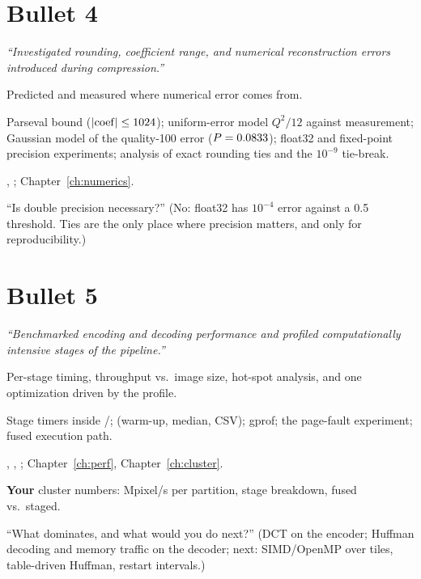 \section{Bullet 4}
\textit{``Investigated rounding, coefficient range, and numerical reconstruction errors introduced during compression.''}

\begin{description}[leftmargin=2.2cm,style=nextline]
\item[What] Predicted and measured where numerical error comes from.
\item[How] Parseval bound ($|{\rm coef}|\le1024$); uniform-error model $Q^2/12$ against measurement; Gaussian model of the quality-100 error ($P=0.0833$); float32 and fixed-point precision experiments; analysis of exact rounding ties and the $10^{-9}$ tie-break.
\item[Where] , ; Chapter~\ref{ch:numerics}.
\item[Expect] ``Is double precision necessary?'' (No: float32 has $10^{-4}$ error against a 0.5 threshold. Ties are the only place where precision matters, and only for reproducibility.)
\end{description}

\section{Bullet 5}
\textit{``Benchmarked encoding and decoding performance and profiled computationally intensive stages of the pipeline.''}

\begin{description}[leftmargin=2.2cm,style=nextline]
\item[What] Per-stage timing, throughput vs.\ image size, hot-spot analysis, and one optimization driven by the profile.
\item[How] Stage timers inside /;  (warm-up, median, CSV); gprof; the page-fault experiment; fused execution path.
\item[Where] , , ; Chapter~\ref{ch:perf}, Chapter~\ref{ch:cluster}.
\item[Evidence to prepare] \textbf{Your} cluster numbers: Mpixel/s per partition, stage breakdown, fused vs.\ staged.
\item[Expect] ``What dominates, and what would you do next?'' (DCT on the encoder; Huffman decoding and memory traffic on the decoder; next: SIMD/OpenMP over tiles, table-driven Huffman, restart intervals.)
\end{description}

